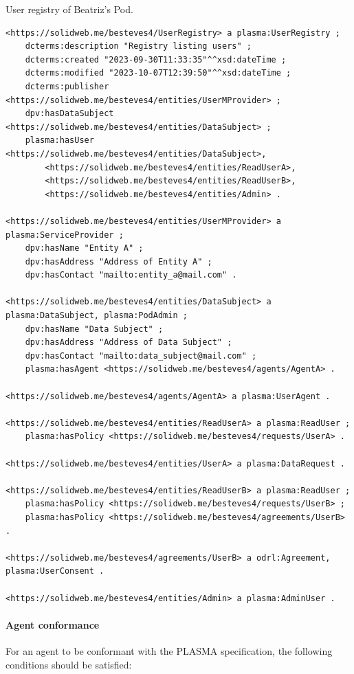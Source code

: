 \begin{listing}[htp]
\caption{User registry of Beatriz's Pod.}
\label{list:plasma_userregistry}
\begin{verbatim}
<https://solidweb.me/besteves4/UserRegistry> a plasma:UserRegistry ;
    dcterms:description "Registry listing users" ;
    dcterms:created "2023-09-30T11:33:35"^^xsd:dateTime ;
    dcterms:modified "2023-10-07T12:39:50"^^xsd:dateTime ;
    dcterms:publisher <https://solidweb.me/besteves4/entities/UserMProvider> ;
    dpv:hasDataSubject <https://solidweb.me/besteves4/entities/DataSubject> ;
    plasma:hasUser <https://solidweb.me/besteves4/entities/DataSubject>,
        <https://solidweb.me/besteves4/entities/ReadUserA>,
        <https://solidweb.me/besteves4/entities/ReadUserB>,
        <https://solidweb.me/besteves4/entities/Admin> .

<https://solidweb.me/besteves4/entities/UserMProvider> a plasma:ServiceProvider ;
    dpv:hasName "Entity A" ;
    dpv:hasAddress "Address of Entity A" ;
    dpv:hasContact "mailto:entity_a@mail.com" .

<https://solidweb.me/besteves4/entities/DataSubject> a plasma:DataSubject, plasma:PodAdmin ;
    dpv:hasName "Data Subject" ;
    dpv:hasAddress "Address of Data Subject" ;
    dpv:hasContact "mailto:data_subject@mail.com" ;
    plasma:hasAgent <https://solidweb.me/besteves4/agents/AgentA> .

<https://solidweb.me/besteves4/agents/AgentA> a plasma:UserAgent .

<https://solidweb.me/besteves4/entities/ReadUserA> a plasma:ReadUser ;
    plasma:hasPolicy <https://solidweb.me/besteves4/requests/UserA> .

<https://solidweb.me/besteves4/entities/UserA> a plasma:DataRequest .

<https://solidweb.me/besteves4/entities/ReadUserB> a plasma:ReadUser ;
    plasma:hasPolicy <https://solidweb.me/besteves4/requests/UserB> ;
    plasma:hasPolicy <https://solidweb.me/besteves4/agreements/UserB> .

<https://solidweb.me/besteves4/agreements/UserB> a odrl:Agreement, plasma:UserConsent .

<https://solidweb.me/besteves4/entities/Admin> a plasma:AdminUser .
\end{verbatim}
\end{listing}

\paragraph{Agent conformance}
For an agent to be conformant with the PLASMA specification, the following conditions should be satisfied:

